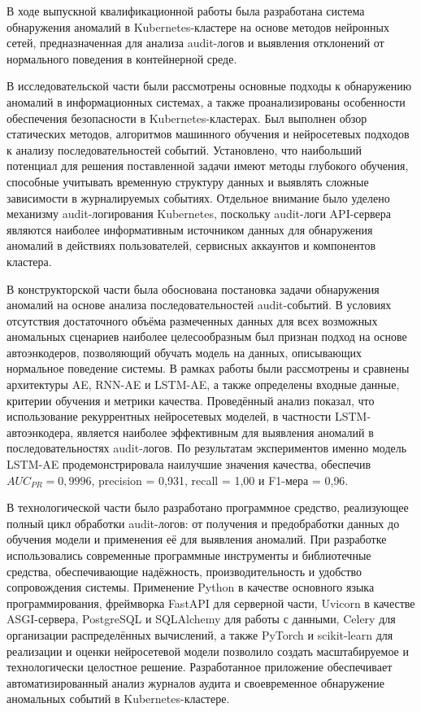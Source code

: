 \conclusion

В ходе выпускной квалификационной работы была разработана система обнаружения аномалий в Kubernetes-кластере на основе методов нейронных сетей, предназначенная для анализа audit-логов и выявления отклонений от нормального поведения в контейнерной среде.

В исследовательской части были рассмотрены основные подходы к обнаружению аномалий в информационных системах, а также проанализированы особенности обеспечения безопасности в Kubernetes-кластерах. Был выполнен обзор статических методов, алгоритмов машинного обучения и нейросетевых подходов к анализу последовательностей событий. Установлено, что наибольший потенциал для решения поставленной задачи имеют методы глубокого обучения, способные учитывать временную структуру данных и выявлять сложные зависимости в журналируемых событиях. Отдельное внимание было уделено механизму audit-логирования Kubernetes, поскольку audit-логи API-сервера являются наиболее информативным источником данных для обнаружения аномалий в действиях пользователей, сервисных аккаунтов и компонентов кластера.

В конструкторской части была обоснована постановка задачи обнаружения аномалий на основе анализа последовательностей audit-событий. В условиях отсутствия достаточного объёма размеченных данных для всех возможных аномальных сценариев наиболее целесообразным был признан подход на основе автоэнкодеров, позволяющий обучать модель на данных, описывающих нормальное поведение системы. В рамках работы были рассмотрены и сравнены архитектуры AE, RNN-AE и LSTM-AE, а также определены входные данные, критерии обучения и метрики качества. Проведённый анализ показал, что использование рекуррентных нейросетевых моделей, в частности LSTM-автоэнкодера, является наиболее эффективным для выявления аномалий в последовательностях audit-логов. По результатам экспериментов именно модель LSTM-AE продемонстрировала наилучшие значения качества, обеспечив $AUC_{PR} = 0{,}9996$, precision = 0{,}931, recall = 1{,}00 и F1-мера = 0{,}96.

В технологической части было разработано программное средство, реализующее полный цикл обработки audit-логов: от получения и предобработки данных до обучения модели и применения её для выявления аномалий. При разработке использовались современные программные инструменты и библиотечные средства, обеспечивающие надёжность, производительность и удобство сопровождения системы. Применение Python в качестве основного языка программирования, фреймворка FastAPI для серверной части, Uvicorn в качестве ASGI-сервера, PostgreSQL и SQLAlchemy для работы с данными, Celery для организации распределённых вычислений, а также PyTorch и scikit-learn для реализации и оценки нейросетевой модели позволило создать масштабируемое и технологически целостное решение. Разработанное приложение обеспечивает автоматизированный анализ журналов аудита и своевременное обнаружение аномальных событий в Kubernetes-кластере.

